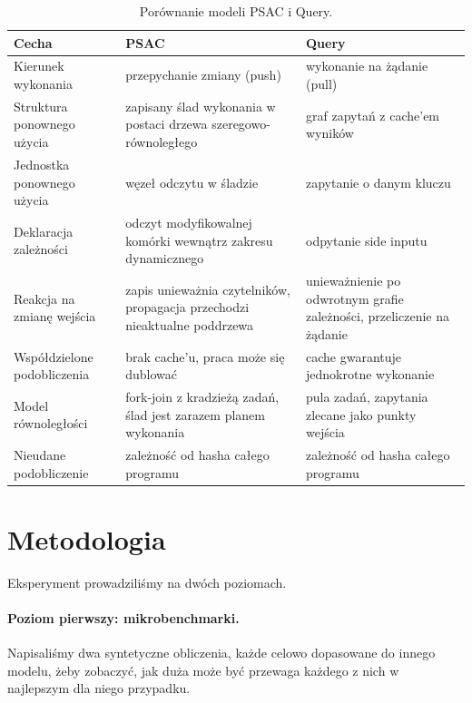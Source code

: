 \documentclass[11pt,a4paper]{article}
\begin{document}
\begin{table}[htbp]
\centering
\caption{Porównanie modeli PSAC i Query.}
\label{tab:modele}
\small
\begin{tabular}{@{}p{3.2cm}p{5.4cm}p{5.4cm}@{}}
\toprule
\textbf{Cecha} & \textbf{PSAC} & \textbf{Query} \\
\midrule
Kierunek wykonania
  & przepychanie zmiany (push)
  & wykonanie na żądanie (pull) \\
Struktura ponownego użycia
  & zapisany ślad wykonania w postaci drzewa szeregowo-równoległego
  & graf zapytań z cache'em wyników \\
Jednostka ponownego użycia
  & węzeł odczytu w śladzie
  & zapytanie o danym kluczu \\
Deklaracja zależności
  & odczyt modyfikowalnej komórki wewnątrz zakresu dynamicznego
  & odpytanie side inputu \\
Reakcja na zmianę wejścia
  & zapis unieważnia czytelników, propagacja przechodzi nieaktualne poddrzewa
  & unieważnienie po odwrotnym grafie zależności, przeliczenie na żądanie \\
Współdzielone podobliczenia
  & brak cache'u, praca może się dublować
  & cache gwarantuje jednokrotne wykonanie \\
Model równoległości
  & fork-join z kradzieżą zadań, ślad jest zarazem planem wykonania
  & pula zadań, zapytania zlecane jako punkty wejścia \\
Nieudane podobliczenie
  & zależność od hasha całego programu
  & zależność od hasha całego programu \\
\bottomrule
\end{tabular}
\end{table}

\section{Metodologia}
\label{sec:metodologia}

Eksperyment prowadziliśmy na dwóch poziomach.

\paragraph{Poziom pierwszy: mikrobenchmarki.} Napisaliśmy dwa syntetyczne %
obliczenia, każde celowo dopasowane do innego modelu, żeby zobaczyć, jak duża
może być przewaga każdego z nich w najlepszym dla niego przypadku.
\end{document}
